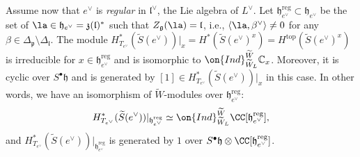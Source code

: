 \documentclass[12pt]{amsart}
\begin{document}
Assume now that $e^\vee$ is {\em{regular}} in $\mathfrak{l}^\vee$, the Lie algebra of $L^\vee$. Let $\mathfrak{h}_{e^\vee}^{\mathrm{reg}} \subset \mathfrak{h}_{e^\vee}$ be the set of $\la \in \mathfrak{h}_{e^\vee}=\mathfrak{z}(\mathfrak{l})^*$ such that $Z_{\mathfrak{g}}(\la)=\mathfrak{l}$, i.e., $\langle \la,\beta^\vee \rangle \neq 0$ for any $\beta \in \Delta_{\mathfrak{p}} \setminus \Delta_{\mathfrak{l}}$. The module $H^*_{T_{e^\vee}}(\widetilde{S}(e^\vee))|_x=H^*(\widetilde{S}(e^\vee)^x)=H^{\mathrm{top}}(\widetilde{S}(e^\vee)^x)$ is irreducible for $x \in \mathfrak{h}_{e^\vee}^{\mathrm{reg}}$ and is  isomorphic to $\on{Ind}_{\widetilde{W}_{L}}^{\widetilde{W}} \mathbb{C}_x$. Moreover, it is cyclic over $S^\bullet\mathfrak{h}$ and is generated by $[1] \in H^*_{T_{e^\vee}}(\widetilde{S}(e^\vee))|_x$ in this case. In other words, we have an isomorphism  of $\widetilde{W}$-modules over $\mathfrak{h}_{e^\vee}^{\mathrm{reg}}$:
\begin{equation*}
H^*_{T_{e^\vee}}(\widetilde{S}(e^\vee))|_{\mathfrak{h}_{e^\vee}^{\mathrm{reg}}} \simeq \on{Ind}_{\widetilde{W}_L}^{\widetilde{W}}\CC[\mathfrak{h}_{e^\vee}^{\mathrm{reg}}],
\end{equation*}
and $H^*_{T_{e^\vee}}(\widetilde{S}(e^\vee))|_{\mathfrak{h}_{e^\vee}^{\mathrm{reg}}}$ is generated by $1$ over $S^\bullet\mathfrak{h} \otimes \CC[\mathfrak{h}_{e^\vee}^{\mathrm{reg}}]$. 










\end{document}
